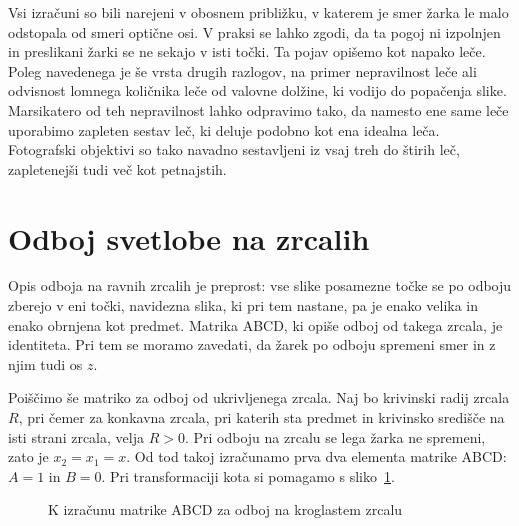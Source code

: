 \begin{remark}
Vsi izračuni so bili narejeni v obosnem 
približku, v katerem je smer žarka le malo odstopala od smeri optične osi. V praksi se lahko 
zgodi, da ta pogoj ni izpolnjen in preslikani žarki se ne sekajo v isti točki. Ta pojav opišemo
kot napako leče. Poleg navedenega je še vrsta drugih razlogov, na primer nepravilnost leče 
ali odvisnost lomnega količnika leče od valovne dolžine, ki vodijo do popačenja slike. 
Marsikatero od teh nepravilnost lahko odpravimo tako, da namesto ene same leče uporabimo 
zapleten sestav leč, ki deluje podobno kot ena idealna leča. Fotografski objektivi so 
tako navadno sestavljeni iz vsaj treh do štirih leč, zapletenejši tudi več kot petnajstih.
\end{remark}
 
\section{Odboj svetlobe na zrcalih}
Opis odboja na ravnih zrcalih je preprost: vse slike posamezne točke se po odboju zberejo v eni točki, 
navidezna slika, ki pri tem nastane, pa je enako velika in enako obrnjena kot predmet.
Matrika ABCD, ki opiše odboj od takega zrcala, je identiteta. Pri tem se moramo
zavedati, da žarek po odboju spremeni smer in z njim tudi os $z$.

Poiščimo še matriko za odboj od ukrivljenega zrcala. Naj bo krivinski radij zrcala
$R$, pri čemer za konkavna zrcala, pri katerih sta predmet in krivinsko središče
na isti strani zrcala, velja $R>0$. Pri odboju na zrcalu se lega žarka ne spremeni, zato 
je $x_2 = x_1 = x$. Od tod takoj izračunamo prva dva elementa matrike ABCD: $A = 1$ in 
$B=0$. Pri transformaciji kota si pomagamo s sliko~\ref{fig:02_zrcalo}. 
\begin{figure}[!h]
\centering
\def\svgwidth{80truemm} 

\caption{K izračunu matrike ABCD za odboj na kroglastem zrcalu}
\label{fig:02_zrcalo}
\end{figure}

